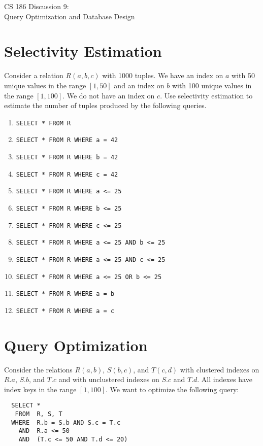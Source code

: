 \documentclass{article}
\newcommand{\sol}[1]{\iftoggle{showsolutions}{\textcolor{red}{#1}}{\phantom{#1}}}
\begin{document}
\begin{center}
  \huge
  CS 186 Discussion 9: \\
  Query Optimization and Database Design
\end{center}

\section{Selectivity Estimation}
Consider a relation $R(a, b, c)$ with 1000 tuples. We have an index on $a$ with
50 unique values in the range $[1, 50]$ and an index on $b$ with 100 unique
values in the range $[1, 100]$. We do not have an index on $c$. Use selectivity
estimation to estimate the number of tuples produced by the following queries.

\begin{enumerate}
  \item \texttt{SELECT * FROM R}
    \sol{1000}
  \item \texttt{SELECT * FROM R WHERE a = 42}
    \sol{$\frac{1}{50} \cdot 1000 = 20$}
  \item \texttt{SELECT * FROM R WHERE b = 42}
    \sol{$\frac{1}{100} \cdot 1000 = 10$}
  \item \texttt{SELECT * FROM R WHERE c = 42}
    \sol{$\frac{1}{10} \cdot 1000 = 100$}
  \item \texttt{SELECT * FROM R WHERE a <= 25}
    \sol{$\frac{1}{2} \cdot 1000 = 500$}
  \item \texttt{SELECT * FROM R WHERE b <= 25}
    \sol{$\frac{1}{4} \cdot 1000 = 250$}
  \item \texttt{SELECT * FROM R WHERE c <= 25}
    \sol{$\frac{1}{10} \cdot 1000 = 100$}
  \item \texttt{SELECT * FROM R WHERE a <= 25 AND b <= 25}
    \sol{$\frac{1}{2}\cdot\frac{1}{4}\cdot 1000 = 125$}
  \item \texttt{SELECT * FROM R WHERE a <= 25 AND c <= 25}
    \sol{$\frac{1}{2}\cdot\frac{1}{10}\cdot 1000 = 50$}
  \item \texttt{SELECT * FROM R WHERE a <= 25 OR b <= 25}
    \sol{$(\frac{1}{2} + \frac{1}{4} - \frac{1}{2}\cdot\frac{1}{4})\cdot 1000 = 625$}
  \item \texttt{SELECT * FROM R WHERE a = b}
    \sol{$\frac{1}{100} \cdot 1000 = 10$}
  \item \texttt{SELECT * FROM R WHERE a = c}
    \sol{$\frac{1}{50} \cdot 1000 = 20$}
\end{enumerate}

\section{Query Optimization}
Consider the relations $R(a, b)$, $S(b, c)$, and $T(c, d)$ with clustered
indexes on $R.a$, $S.b$, and $T.c$ and with unclustered indexes on $S.c$ and
$T.d$. All indexes have index keys in the range $[1, 100]$. We want to optimize
the following query:
\begin{verbatim}
  SELECT *
   FROM  R, S, T
  WHERE  R.b = S.b AND S.c = T.c
    AND  R.a <= 50
    AND  (T.c <= 50 AND T.d <= 20)
\end{verbatim}
\end{document}
